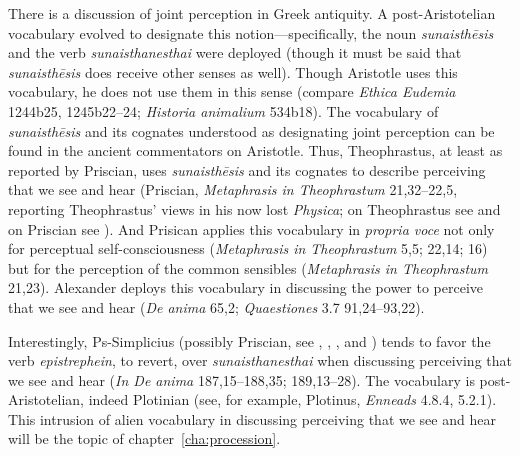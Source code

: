There is a discussion of joint perception in Greek antiquity. A post-Aristotelian vocabulary evolved to designate this notion—specifically, the noun \emph{sunaisthēsis} and the verb \emph{sunaisthanesthai} were deployed (though it must be said that \emph{sunaisthēsis} does receive other senses as well). Though Aristotle uses this vocabulary, he does not use them in this sense (compare \emph{Ethica Eudemia} 1244b25, 1245b22–24; \emph{Historia animalium} 534b18). The vocabulary of \emph{sunaisthēsis} and its cognates understood as designating joint perception can be found in the ancient commentators on Aristotle. Thus, Theophrastus, at least as reported by Priscian, uses \emph{sunaisthēsis} and its cognates to describe perceiving that we see and hear (Priscian, \emph{Metaphrasis in Theophrastum} 21,32–22,5, reporting Theophrastus' views in his now lost \emph{Physica}; on Theophrastus see \citealt{Caston2020-CASTOP-2} and on Priscian see \citealt{Kalderon:2017rw}). And Prisican applies this vocabulary in \emph{propria voce} not only for perceptual self-consciousness (\emph{Metaphrasis in Theophrastum} 5,5; 22,14; 16) but for the perception of the common sensibles (\emph{Metaphrasis in Theophrastum} 21,23). Alexander deploys this vocabulary in discussing the power to perceive that we see and hear (\emph{De anima} 65,2; \emph{Quaestiones} 3.7 91,24–93,22). 

Interestingly, Ps-Simplicius (possibly Priscian, see \citealt[103–41]{Steel:1997il}, \citealt[1–4]{Steel:2013xi}, \citealt[1–7]{Blumenthal:2000rf}, and \citealt{Perkams:2005by}) tends to favor the verb \emph{epistre\-phein}, to revert, over \emph{sunaisthanesthai} when discussing perceiving that we see and hear (\emph{In De anima} 187,15–188,35; 189,13–28). The vocabulary is post-Aristotelian, indeed Plotinian (see, for example, Plotinus, \emph{Enneads} 4.8.4, 5.2.1). This intrusion of alien vocabulary in discussing perceiving that we see and hear will be the topic of chapter~\ref{cha:procession}.






